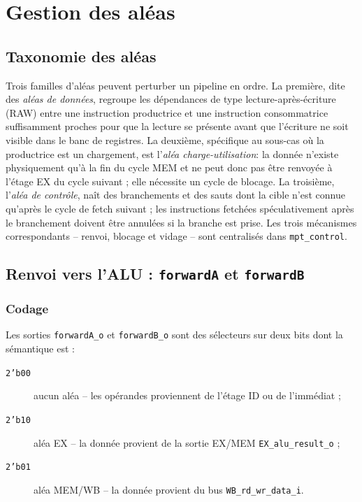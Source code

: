 \documentclass[11pt,a4paper,oneside]{report}
\begin{document}
\chapter{Gestion des aléas}
\label{ch:hazards}

\section{Taxonomie des aléas}
Trois familles d'aléas peuvent perturber un pipeline en ordre. La
première, dite des \emph{aléas de données}, regroupe les
dépendances de type lecture-après-écriture (RAW) entre une
instruction productrice et une instruction consommatrice
suffisamment proches pour que la lecture se présente avant que
l'écriture ne soit visible dans le banc de registres. La deuxième,
spécifique au sous-cas où la productrice est un chargement, est
l'\emph{aléa charge-utilisation}: la donnée n'existe physiquement
qu'à la fin du cycle MEM et ne peut donc pas être renvoyée à
l'étage EX du cycle suivant ; elle nécessite un cycle de blocage.
La troisième, l'\emph{aléa de contrôle}, naît des branchements et
des sauts dont la cible n'est connue qu'après le cycle de fetch
suivant ; les instructions fetchées spéculativement après le
branchement doivent être annulées si la branche est prise. Les
trois mécanismes correspondants -- renvoi, blocage et vidage -- sont
centralisés dans \texttt{mpt\_control}.


\section{Renvoi vers l'ALU : \texttt{forwardA} et \texttt{forwardB}}
\label{sec:forward-ab}

\subsection{Codage}
Les sorties \texttt{forwardA\_o} et \texttt{forwardB\_o} sont des
sélecteurs sur deux bits dont la sémantique est :
\begin{description}
  \item[\texttt{2'b00}] aucun aléa  --  les opérandes proviennent
        de l'étage ID ou de l'immédiat ;
  \item[\texttt{2'b10}] aléa EX  --  la donnée provient de la
        sortie EX/MEM \texttt{EX\_alu\_result\_o} ;
  \item[\texttt{2'b01}] aléa MEM/WB  --  la donnée provient du
        bus \texttt{WB\_rd\_wr\_data\_i}.
\end{description}
\end{document}
